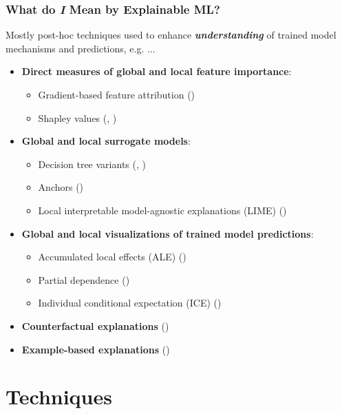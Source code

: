 \documentclass[11pt,aspectratio=169,hyperref={colorlinks}]{beamer}
\begin{document}
	\begin{frame}
	
		\frametitle{What do \textit{\textbf{I}} Mean by Explainable ML?}

		Mostly post-hoc techniques used to enhance \textit{\textbf{understanding}} of trained model mechanisms and predictions, e.g. ...
		\begin{itemize}
			\item \textbf{Direct measures of global and local feature importance}: 
			\begin{itemize}\footnotesize
				\item Gradient-based feature attribution (\citet{grad_attr})
				\item Shapley values (\citet{shapley}, \citet{shapley1953value})
			\end{itemize}
			\item \textbf{Global and local surrogate models}: 
			\begin{itemize}\footnotesize
				\item Decision tree variants (\citet{viper}, \citet{dt_surrogate1})
				\item Anchors (\citet{anchors})
				\item Local interpretable model-agnostic explanations (LIME) (\citet{lime})
			\end{itemize}
			\item \textbf{Global and local visualizations of trained model predictions}: 
			\begin{itemize}\footnotesize
				\item Accumulated local effects (ALE) (\citet{ale_plot}) 
				\item Partial dependence (\citet{esl})
				\item Individual conditional expectation (ICE) (\citet{ice_plots})
			\end{itemize}
			\item \textbf{Counterfactual explanations} (\citet{mothilal2020explaining})
			\item \textbf{Example-based explanations} (\citet{molnar})
		\end{itemize}\normalsize
			
	\end{frame}

	\section{Techniques}
	
\end{document}
